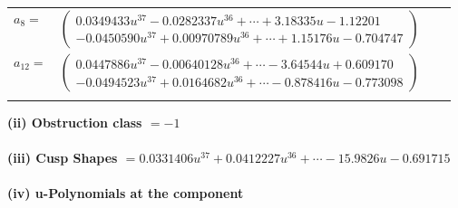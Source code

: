 \documentclass[1p]{elsarticle_modified}
\theoremstyle{definition}
\begin{document}
\begin{tabular}{m{7pt} m{180pt} m{7pt} m{180pt} }
\flushright $a_{8}=$&$\begin{pmatrix}0.0349433 u^{37}-0.0282337 u^{36}+\cdots+3.18335 u-1.12201\\-0.0450590 u^{37}+0.00970789 u^{36}+\cdots+1.15176 u-0.704747\end{pmatrix}$ \\
\flushright $a_{12}=$&$\begin{pmatrix}0.0447886 u^{37}-0.00640128 u^{36}+\cdots-3.64544 u+0.609170\\-0.0494523 u^{37}+0.0164682 u^{36}+\cdots-0.878416 u-0.773098\end{pmatrix}$\\&\end{tabular}
\flushleft \textbf{(ii) Obstruction class $= -1$}\\~\\
\flushleft \textbf{(iii) Cusp Shapes $= 0.0331406 u^{37}+0.0412227 u^{36}+\cdots-15.9826 u-0.691715$}\\~\\
\newpage\renewcommand{\arraystretch}{1}
\flushleft \textbf{(iv) u-Polynomials at the component}\newline \\
\end{document}
